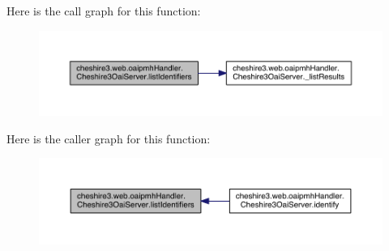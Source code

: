 Here is the call graph for this function\-:
\nopagebreak
\begin{figure}[H]
\begin{center}
\leavevmode
\includegraphics[width=350pt]{classcheshire3_1_1web_1_1oaipmh_handler_1_1_cheshire3_oai_server_af4c971028461682093c67f83422752fc_cgraph}
\end{center}
\end{figure}




Here is the caller graph for this function\-:
\nopagebreak
\begin{figure}[H]
\begin{center}
\leavevmode
\includegraphics[width=350pt]{classcheshire3_1_1web_1_1oaipmh_handler_1_1_cheshire3_oai_server_af4c971028461682093c67f83422752fc_icgraph}
\end{center}
\end{figure}


